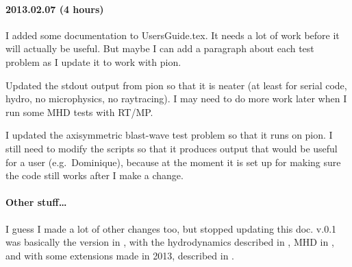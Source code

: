\documentclass[a4paper,11pt]{article}
\begin{document}
\paragraph{2013.02.07 (4 hours)}
I added some documentation to UsersGuide.tex.
It needs a lot of work before it will actually be useful.
But maybe I can add a paragraph about each test problem as I update it to work with pion.

Updated the stdout output from pion so that it is neater (at least for serial code, hydro, no microphysics, no raytracing).  I may need to do more work later when I run some MHD tests with RT/MP.

I updated the axisymmetric blast-wave test problem so that it runs on pion.
I still need to modify the scripts so that it produces output that would be useful for a user (e.g.\ Dominique), because at the moment it is set up for making sure the code still works after I make a change.

\paragraph{Other stuff\ldots}
I guess I made a lot of other changes too, but stopped updating this doc.
\pion{} v.0.1 was basically the version in \citet{Mac12}, with the hydrodynamics described in \citet{MacLim10}, MHD in \citet{MacLim11}, and with some extensions made in 2013, described in \citet{MacLanGva13}.





\end{document}
